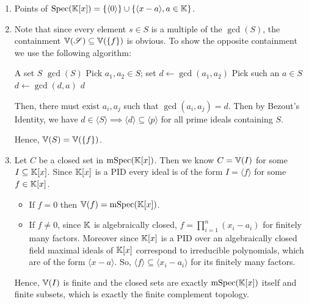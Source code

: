 \documentclass[Notebook.tex]{subfiles}
\begin{document}
\begin{solution}
    \bbni 
    \begin{enumerate}[label=(\alph*),ref=\theenumi\alph*]
        \item Points of $\operatorname{Spec}(\mathbb K[x]) = \{\langle 0 \rangle\} \cup \{\langle x-a \rangle, a \in \mathbb K\}$.
        \item Note that since every element $s \in S$ is a multiple of the $\gcd(S)$, the containment $\mathbb V(\operatorname{\mathscr S}) \subseteq \mathbb V(\{f\})$ is obvious. To show the opposite containment we use the following algorithm: 
        
        \begin{algorithmic}
        \Require A set $S$
        \Ensure $\gcd(S)$
        \State Pick $a_1, a_2 \in S$; set $d \gets \gcd(a_1, a_2)$
            \State Pick such an $a \in S$
            \State $d \gets \gcd(d, a)$
        \EndWhile
        \State \Return $d$
        \end{algorithmic}

        Then, there must exist $a_i, a_j$ such that $\gcd(a_i, a_j) = d$. Then by Bezout's Identity, we have $d \in \langle S \rangle \implies \langle d \rangle \subseteq \langle p \rangle$ for all prime ideals containing $S$.
        
        Hence, $\mathbb V(S) = \mathbb V(\{f\})$. 

        \item Let $C$ be a closed set in $\operatorname{mSpec}(\mathbb K[x])$. Then we know $C = \mathbb V(I)$ for some $I \subseteq \mathbb K[x]$. Since $\mathbb K[x]$ is a PID every ideal is of the form $I = \langle f \rangle$ for some $f \in \mathbb K[x]$. 
        \begin{itemize}
            \item  If $f = 0$ then $\mathbb V(f) = \operatorname{mSpec}(\mathbb K[x])$. 
            \item If $f \neq 0$, since $\mathbb K$ is algebraically closed, $f = \prod^n_{i=1} (x_i - a_i)$ for finitely many factors. Moreover since $\mathbb K[x]$ is a PID over an algebraically closed field maximal ideals of $\mathbb K[x]$ correspond to irreducible polynomials, which are of the form $\langle x - a \rangle$. So, $\langle f \rangle \subseteq \langle x_i - a_i \rangle$ for its finitely many factors.
        \end{itemize}
        Hence, $\mathbb V(I)$ is finite and the closed sets are exactly $\operatorname{mSpec}(\mathbb K[x])$ itself and finite subsets, which is exactly the finite complement topology.
    \end{enumerate}
\end{solution}
\end{document}
